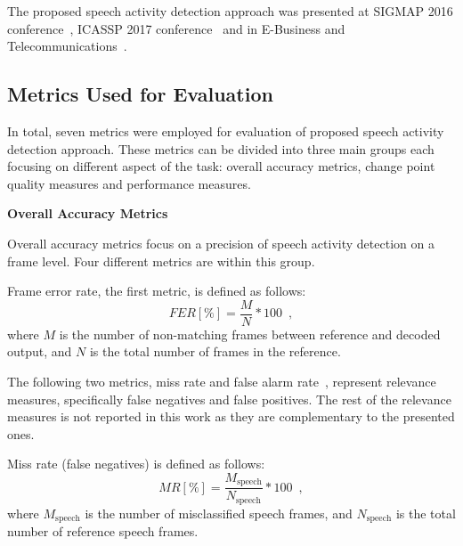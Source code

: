 \documentclass[FM,noheader,EN,bwtitles]{tulthesis}
\begin{document}
The proposed speech activity detection approach was presented at SIGMAP 2016 conference~\parencite{SIGMAP16}, ICASSP 2017 conference~\parencite{ICASSP17} and in E-Business and Telecommunications~\parencite{SPRINGER17}.

\subsection{Metrics Used for Evaluation}
\label{ss:SADmetrics}
In total, seven metrics were employed for evaluation of proposed speech activity detection approach.
These metrics can be divided into three main groups each focusing on different aspect of the task: overall accuracy metrics, change point quality measures and performance measures.


\bigskip
\noindent
\textbf{Overall Accuracy Metrics}
\medskip

\noindent 
Overall accuracy metrics focus on a precision of speech activity detection on a frame level.
Four different metrics are within this group.

Frame error rate, the first metric, is defined as follows:
\begin{equation}
FER [\%] = \frac{M}{N} * 100 \enspace,
\label{eq:fer}\end{equation}
where $M$ is the number of non-matching frames between reference and decoded output, and $N$ is the total number of frames in the reference.

The following two metrics, miss rate and false alarm rate~\parencite{DBLP:conf/interspeech/RyantLY13}, represent relevance measures, specifically false negatives and false positives.
The rest of the relevance measures is not reported in this work as they are complementary to the presented ones.

Miss rate (false negatives) is defined as follows:
\begin{equation}
MR [\%] = \frac{M_{\mathrm{speech}}}{N_{\mathrm{speech}}} * 100 \enspace,
\label{eq:ms}\end{equation}
where $M_\mathrm{{speech}}$ is the number of misclassified speech frames, and $N_\mathrm{{speech}}$ is the total number of reference speech frames.
\end{document}
